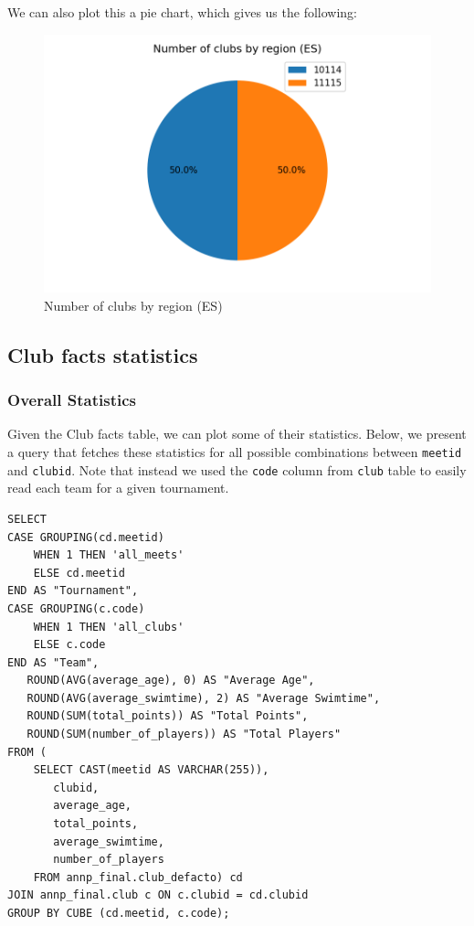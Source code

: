 \documentclass[a4paper, 11pt]{article}
\begin{document}
We can also plot this a pie chart, which gives us the following:

\begin{figure}[H]
    \centering
    \includegraphics[width=.6\textwidth]{img/clubsbyregion-es-pie}
    \caption{Number of clubs by region (ES)}
    \label{fig:clubs-by-region-es-pie}
\end{figure}

\subsection{Club facts statistics}

\subsubsection{Overall Statistics}

Given the Club facts table, we can plot some of their statistics. Below, we present a query that fetches these statistics for all possible combinations
between \texttt{meetid} and \texttt{clubid}. Note that instead we used the \texttt{code} column from \texttt{club} table to easily read each team for 
a given tournament. 

\begin{verbatim}
SELECT 
CASE GROUPING(cd.meetid)
    WHEN 1 THEN 'all_meets'
    ELSE cd.meetid
END AS "Tournament",
CASE GROUPING(c.code)
    WHEN 1 THEN 'all_clubs'
    ELSE c.code
END AS "Team",
   ROUND(AVG(average_age), 0) AS "Average Age",
   ROUND(AVG(average_swimtime), 2) AS "Average Swimtime",
   ROUND(SUM(total_points)) AS "Total Points",
   ROUND(SUM(number_of_players)) AS "Total Players"
FROM (
    SELECT CAST(meetid AS VARCHAR(255)),
       clubid,
       average_age,
       total_points,
       average_swimtime,
       number_of_players
    FROM annp_final.club_defacto) cd
JOIN annp_final.club c ON c.clubid = cd.clubid
GROUP BY CUBE (cd.meetid, c.code);
\end{verbatim}
\end{document}
